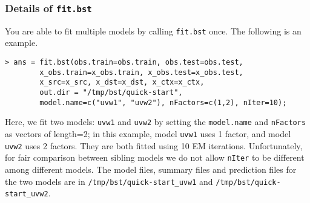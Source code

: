 \subsubsection{Details of {\tt fit.bst}}
\label{sec:fit.bst}

You are able to fit multiple models by calling {\tt fit.bst} once.  The following is an example.
{\small\begin{verbatim}
> ans = fit.bst(obs.train=obs.train, obs.test=obs.test,
        x_obs.train=x_obs.train, x_obs.test=x_obs.test,
        x_src=x_src, x_dst=x_dst, x_ctx=x_ctx,
        out.dir = "/tmp/bst/quick-start", 
        model.name=c("uvw1", "uvw2"), nFactors=c(1,2), nIter=10);
\end{verbatim}}
\noindent Here, we fit two models: {\tt uvw1} and {\tt uvw2} by setting the {\tt model.name} and {\tt nFactors} as vectors of length=2; in this example, model {\tt uvw1} uses 1 factor, and model {\tt uvw2} uses 2 factors.  They are both fitted using 10 EM iterations.  Unfortunately, for fair comparison between sibling models we do not allow {\tt nIter} to be different among different models.  The model files, summary files and prediction files for the two models are in {\tt /tmp/bst/quick-start\_uvw1} and {\tt /tmp/bst/quick-start\_uvw2}.


